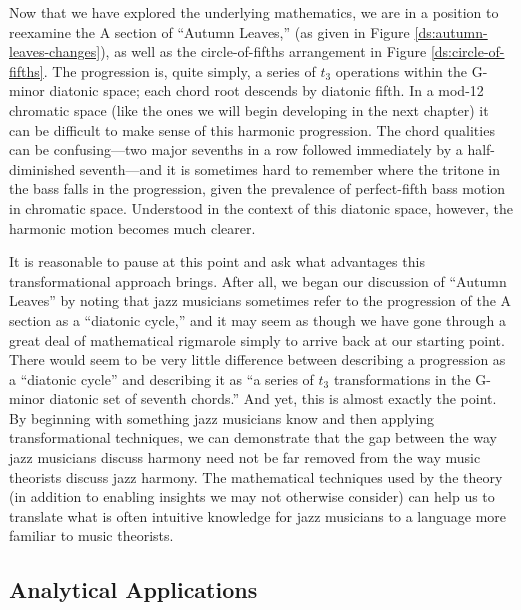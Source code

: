 \documentclass[diss]{subfiles}
\begin{document}
Now that we have explored the underlying mathematics, we are in a position to
reexamine the A section of “Autumn Leaves,” (as given in Figure
\ref{ds:autumn-leaves-changes}), as well as the circle-of-fifths arrangement
in Figure \ref{ds:circle-of-fifths}. The progression is, quite simply, a
series of $t_3$ operations within the G-minor diatonic space; each chord root
descends by diatonic fifth. In a mod-12 chromatic space (like the ones we
will begin developing in the next chapter) it can be difficult to make sense
of this harmonic progression. The chord qualities can be confusing---two major
sevenths in a row followed immediately by a half-diminished seventh---and it
is sometimes hard to remember where the tritone in the bass falls in the
progression, given the prevalence of perfect-fifth bass motion in chromatic
space. Understood in the context of this diatonic space, however, the harmonic
motion becomes much clearer.

It is reasonable to pause at this point and ask what advantages this
transformational approach brings. After all, we began our discussion of
“Autumn Leaves” by noting that jazz musicians sometimes refer to the
progression of the A section as a “diatonic cycle,” and it may seem as though
we have gone through a great deal of mathematical rigmarole simply to arrive
back at our starting point. There would seem to be very little difference
between describing a progression as a “diatonic cycle” and describing it as “a
series of $t_3$ transformations in the G-minor diatonic set of seventh
chords.” And yet, this is almost exactly the point. By beginning with
something jazz musicians know and then applying transformational techniques,
we can demonstrate that the gap between the way jazz musicians discuss harmony
need not be far removed from the way music theorists discuss jazz harmony. The
mathematical techniques used by the theory (in addition to enabling insights
we may not otherwise consider) can help us to translate what is often
intuitive knowledge for jazz musicians to a language more familiar to music
theorists.


\subsection{Analytical Applications}
\label{subsec:analytical-applications} %
\FloatBarrier
\end{document}
